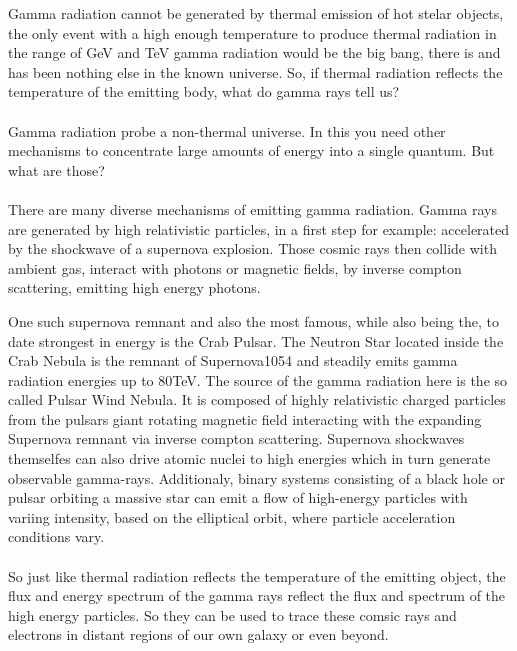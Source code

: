 \documentclass[12pt,article,type=msc,colorback,accentcolor=tud9c]{tudthesis}
\begin{document}
Gamma radiation cannot be generated by thermal emission of hot stelar objects, the only event with a high enough temperature to produce thermal radiation in the range of GeV and TeV gamma radiation would be the big bang, there is and has been nothing else in the known universe. So, if thermal radiation reflects the temperature of the emitting body, what do gamma rays tell us?\\\\
Gamma radiation probe a non-thermal universe. In this you need other mechanisms to concentrate large amounts of energy into a single quantum. But what are those?\\\\
There are many diverse mechanisms of emitting gamma radiation. Gamma rays are generated by high relativistic particles, in a first step for example: accelerated by the shockwave of a supernova explosion. Those cosmic rays then collide with ambient gas, interact with photons or magnetic fields, by inverse compton scattering, emitting high energy photons.

One such supernova remnant and also the most famous, while also being the, to date strongest in energy is the Crab Pulsar. The Neutron Star located inside the Crab Nebula is the remnant of Supernova1054 and steadily emits gamma radiation energies up to 80TeV. The source of the gamma radiation here is the so called Pulsar Wind Nebula. It is composed of highly relativistic charged particles from the pulsars giant rotating magnetic field interacting with the expanding Supernova remnant via inverse compton scattering. Supernova shockwaves themselfes can also drive atomic nuclei to high energies which in turn generate observable gamma-rays. Additionaly, binary systems consisting of a black hole or pulsar orbiting a massive star can emit a flow of high-energy particles with variing intensity, based on the elliptical orbit, where particle acceleration conditions vary.
\\\\
So just like thermal radiation reflects the temperature of the emitting object, the flux and energy spectrum of the gamma rays reflect the flux and spectrum of the high energy particles. So they can be used to trace these comsic rays and electrons in distant regions of our own galaxy or even beyond. \\\\
\end{document}
